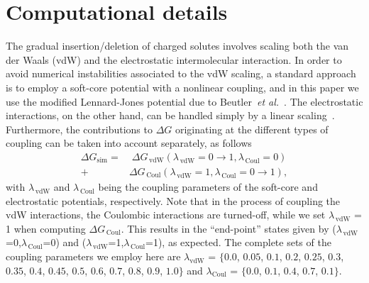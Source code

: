 \documentclass[3p,twocolumn]{elsarticle}
\begin{document}
\section{Computational details}
\label{sec:sim_details}

The gradual insertion/deletion of charged solutes involves scaling both the van der Waals (vdW) and the electrostatic intermolecular interaction. In order to avoid numerical instabilities associated to the vdW scaling, a standard approach is to employ a soft-core potential with a nonlinear coupling, and in this paper we use the modified Lennard-Jones potential due to Beutler~\textit{et al.}~\cite{Beutler_1994}. The electrostatic interactions, on the other hand, can be handled simply by a linear scaling~\cite{Naden_2015}. Furthermore, the contributions to $\Delta G$ originating at the different types of coupling can be taken into account separately, as follows
\begin{equation}
\begin{split}
\Delta G_{\text{sim}} =& \; \Delta G_{\,\text{vdW}} (\lambda_{\,\text{vdW}} = 0\rightarrow  1, \lambda_{\, \text{Coul}} = 0) \\
+ \; &\Delta G_{\,\text{Coul}} (\lambda_{\, \text{vdW}} = 1,\lambda_{\,\text{Coul}} = 0 \rightarrow 1),
\end{split}
\end{equation}
with $\lambda_{\,\text{vdW}}$ and $\lambda_{\,\text{Coul}}$ being the coupling parameters of the soft-core and electrostatic potentials, respectively. Note that in the process of coupling the vdW interactions, the Coulombic interactions are turned-off, while we set $\lambda_{\,\text{vdW}}$ = 1 when computing $\Delta G_{\,\text{Coul}}$.  This results in the ``end-point'' states given by ($\lambda_{\,\text{vdW}}$=0,$\lambda_{\,\text{Coul}}$=0) and ($\lambda_{\,\text{vdW}}$=1,$\lambda_{\,\text{Coul}}$=1), as expected. The complete sets of the coupling parameters we employ here are $\lambda_{\text{vdW}}$ = $\{0.0$, $0.05$, $0.1$, $0.2$, $0.25$, $0.3$, $0.35$, $0.4$, $0.45$, $0.5$, $0.6$, $0.7$, $0.8$, $0.9$, $1.0\}$ and $\lambda_{\text{Coul}}$ = $\{0.0$, $0.1$, $0.4$, $0.7$, $0.1\}$.
\end{document}
